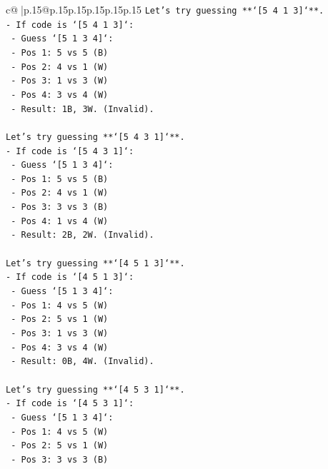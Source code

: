 \documentclass{article}
\begin{document}
{\begin{supertabular}{c@{$\;$}|p{.15\linewidth}@{}p{.15\linewidth}p{.15\linewidth}p{.15\linewidth}p{.15\linewidth}p{.15\linewidth}}
{{{\texttt{Let's try guessing **`{[}5 4 1 3{]}`**.} \\
\texttt{{-} If code is `{[}5 4 1 3{]}`:} \\
\texttt{    {-} Guess `{[}5 1 3 4{]}`:} \\
\texttt{        {-} Pos 1: 5 vs 5 (B)} \\
\texttt{        {-} Pos 2: 4 vs 1 (W)} \\
\texttt{        {-} Pos 3: 1 vs 3 (W)} \\
\texttt{        {-} Pos 4: 3 vs 4 (W)} \\
\texttt{        {-} Result: 1B, 3W. (Invalid).} \\
\\ 
\texttt{Let's try guessing **`{[}5 4 3 1{]}`**.} \\
\texttt{{-} If code is `{[}5 4 3 1{]}`:} \\
\texttt{    {-} Guess `{[}5 1 3 4{]}`:} \\
\texttt{        {-} Pos 1: 5 vs 5 (B)} \\
\texttt{        {-} Pos 2: 4 vs 1 (W)} \\
\texttt{        {-} Pos 3: 3 vs 3 (B)} \\
\texttt{        {-} Pos 4: 1 vs 4 (W)} \\
\texttt{        {-} Result: 2B, 2W. (Invalid).} \\
\\ 
\texttt{Let's try guessing **`{[}4 5 1 3{]}`**.} \\
\texttt{{-} If code is `{[}4 5 1 3{]}`:} \\
\texttt{    {-} Guess `{[}5 1 3 4{]}`:} \\
\texttt{        {-} Pos 1: 4 vs 5 (W)} \\
\texttt{        {-} Pos 2: 5 vs 1 (W)} \\
\texttt{        {-} Pos 3: 1 vs 3 (W)} \\
\texttt{        {-} Pos 4: 3 vs 4 (W)} \\
\texttt{        {-} Result: 0B, 4W. (Invalid).} \\
\\ 
\texttt{Let's try guessing **`{[}4 5 3 1{]}`**.} \\
\texttt{{-} If code is `{[}4 5 3 1{]}`:} \\
\texttt{    {-} Guess `{[}5 1 3 4{]}`:} \\
\texttt{        {-} Pos 1: 4 vs 5 (W)} \\
\texttt{        {-} Pos 2: 5 vs 1 (W)} \\
\texttt{        {-} Pos 3: 3 vs 3 (B)} \\
}}}
\end{supertabular}}
\end{document}
